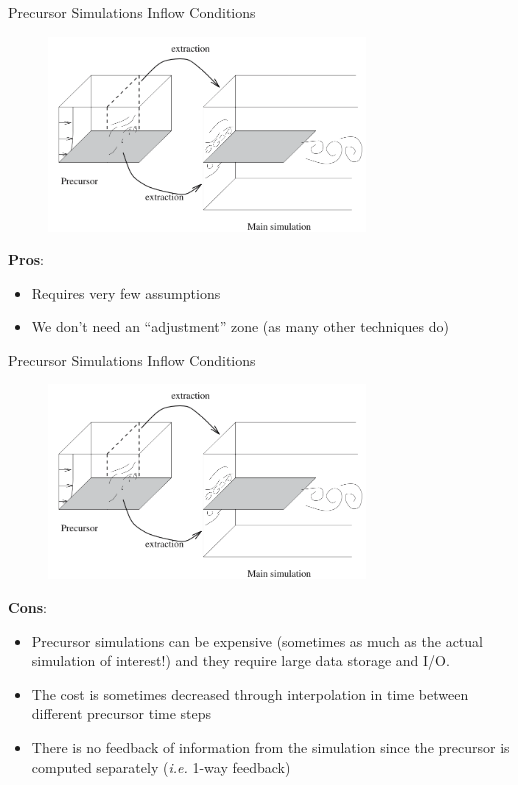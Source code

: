 \begin{frame}{Precursor Simulations Inflow Conditions}
	\begin{figure}
		\includegraphics[width=0.75\textwidth]{inlet3}
	\end{figure}
	\textbf{Pros}:
	\begin{itemize}
	\item Requires very few assumptions
	\item We don't need an ``adjustment'' zone (as many other techniques do)
	\end{itemize}
\end{frame}
\begin{frame}{Precursor Simulations Inflow Conditions}
	\begin{figure}
		\includegraphics[width=0.75\textwidth]{inlet3}
	\end{figure}
	\textbf{Cons}:
	\begin{itemize}
	\item  Precursor simulations can be expensive (sometimes as much as the actual simulation of interest!) and they require large data storage and I/O. 
	\item The cost is sometimes decreased through interpolation in time between different precursor time steps
	\item There is no feedback of information from the  simulation since the precursor is computed separately (\textit{i.e.} 1-way feedback)
	\end{itemize}
\end{frame}
